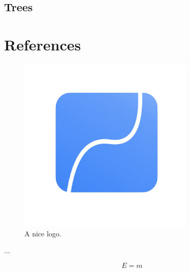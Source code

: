 \documentclass[]{article}
\begin{document}
\subsection{Trees}



 






\section{References}
\begin{figure}
	\centering
	\includegraphics[width=0.75\textwidth]{roundedrect.png}
	\caption{A nice logo.}
	\label{fig:logo}
\end{figure}

\begin{center}
	...
\end{center}
	
\begin{equation}
	E=m
\end{equation}
\end{document}
